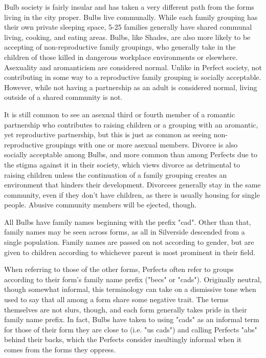 \documentclass[blue]{Silversiders}
\begin{document}
Bulb society is fairly insular and has taken a very different path from the forms living in the city proper. Bulbs live communally. While each family grouping has their own private sleeping space, 5-25 families generally have shared communal living, cooking, and eating areas. Bulbs, like Shades, are also more likely to be accepting of non-reproductive family groupings, who generally take in the children of those killed in dangerous workplace environments or elsewhere. Asexuality and aromanticism are considered normal. Unlike in Perfect society, not contributing in some way to a reproductive family grouping is socially acceptable. However, while not having a partnership as an adult is considered normal, living outside of a shared community is not.

It is still common to see an asexual third or fourth member of a romantic partnership who contributes to raising children or a grouping with an aromantic, yet reproductive partnership, but this is just as common as seeing non-reproductive groupings with one or more asexual members. Divorce is also socially acceptable among Bulbs, and more common than among Perfects due to the stigma against it in their society, which views divorce as detrimental to raising children unless the continuation of a family grouping creates an environment that hinders their development. Divorcees generally stay in the same community, even if they don't have children, as there is usually housing for single people. Abusive community members will be ejected, though.

All Bulbs have family names beginning with the prefix "cad". Other than that, family names may be seen across forms, as all in Silverside descended from a single population. Family names are passed on not according to gender, but are given to children according to whichever parent is most prominent in their field. 

When referring to those of the other forms, Perfects often refer to groups according to their form's family name prefix ("becs" or "cads"). Originally neutral, though somewhat informal, this terminology can take on a dismissive tone when used to say that all among a form share some negative trait. The terms themselves are not slurs, though, and each form generally takes pride in their family name prefix. In fact, Bulbs have taken to using "cads" as an informal term for those of their form they are close to (i.e. "us cads") and calling Perfects "abs" behind their backs, which the Perfects consider insultingly informal when it comes from the forms they oppress.
\end{document}
